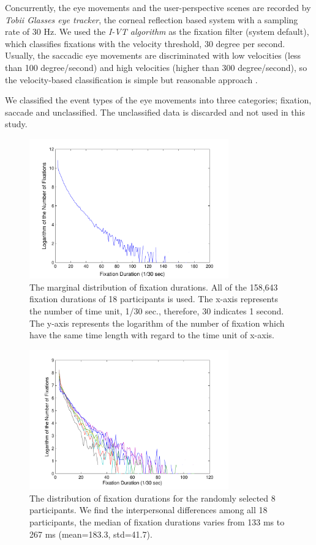 \documentclass[oneside,master]{snueethesis}
\begin{document}
Concurrently, the eye movements and the user-perspective scenes are recorded by \textit{Tobii Glasses eye tracker}, the corneal reflection based system with a sampling rate of 30 Hz. We used the \textit{I-VT algorithm} as the fixation filter (system default), which classifies fixations with the velocity threshold, 30 degree per second. Usually, the saccadic eye movements are discriminated with low velocities (less than 100 degree/second) and high velocities (higher than 300 degree/second), so the velocity-based classification is simple but reasonable approach \cite{Salvucci2000}.

We classified the event types of the eye movements into three categories; fixation, saccade and unclassified. The unclassified data is discarded and not used in this study.

\begin{figure}
  \centerline{\includegraphics[width=86mm,trim=10mm 3mm 10mm 3mm]{./eps/marginal_fixation_duration.pdf}}
  \caption[The marginal distribution of fixation durations]{The marginal distribution of fixation durations. All of the 158,643 fixation durations of 18 participants is used. The x-axis represents the number of time unit, 1/30 sec., therefore, 30 indicates 1 second. The y-axis represents the logarithm of the number of fixation which have the same time length with regard to the time unit of x-axis.}
  \label{fig:marginal-fixation-duration}
\end{figure}

\begin{figure}
  \centerline{\includegraphics[width=86mm,trim=10mm 3mm 10mm 3mm]{./eps/individual_fixation_duration.pdf}}
  \caption[The distribution of fixation durations for individuals]{The distribution of fixation durations for the randomly selected 8 participants. We find the interpersonal differences among all 18 participants, the median of fixation durations varies from 133 ms to 267 ms (mean=183.3, std=41.7).}
  \label{fig:individual-fixation-duration}
\end{figure}
\end{document}
